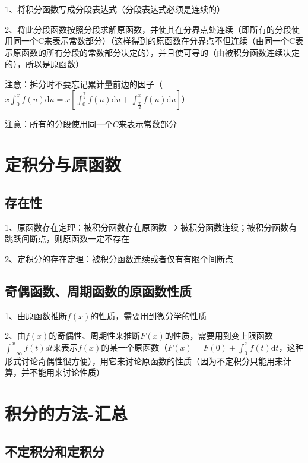 1、将积分函数写成分段表达式（分段表达式必须是连续的）

2、将此分段函数按照分段求解原函数，并使其在分界点处连续（即所有的分段使用同一个C来表示常数部分）（这样得到的原函数在分界点不但连续（由同一个C表示原函数的所有分段的常数部分决定的），并且使可导的（由被积分函数连续决定的），所以是原函数）

注意：拆分时不要忘记累计量前边的因子（$x \int_{0}^{x} f(u) \mathrm{d} u=x\left[\int_{0}^{\frac{\pi}{2}} f(u) \mathrm{d} u+\int_{\frac{\pi}{2}}^{x} f(u) \mathrm{d} u\right]$）

注意：所有的分段使用同一个$C$来表示常数部分

\section{定积分与原函数}



\subsection{存在性}

1、原函数存在定理：被积分函数存在原函数 ⇒ 被积分函数连续；被积分函数有跳跃间断点，则原函数一定不存在

2、定积分的存在定理：被积分函数连续或者仅有有限个间断点



\subsection{奇偶函数、周期函数的原函数性质}

1、由原函数推断$f(x)$的性质，需要用到微分学的性质

2、由$f(x)$的奇偶性、周期性来推断$F(x)$的性质，需要用到变上限函数$\int_{-\infty}^{x}f(t)dt$来表示$f(x)$的某一个原函数（$F(x)=F(0)+\int_{0}^{x} f(t) \mathrm{d} t$，这种形式讨论奇偶性很方便），用它来讨论原函数的性质（因为不定积分只能用来计算，并不能用来讨论性质）

\section{积分的方法-汇总}



\subsection{不定积分和定积分}

